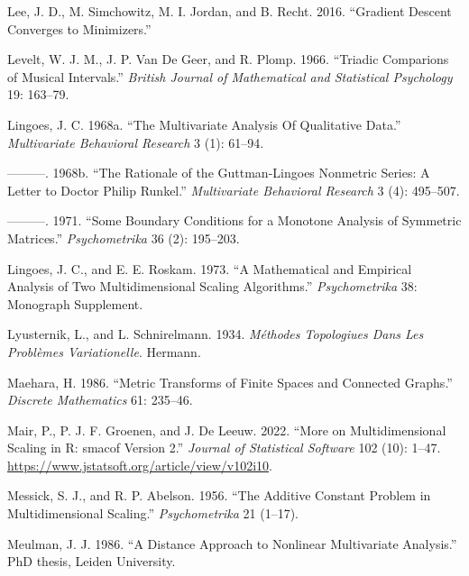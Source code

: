 \documentclass[
  12pt,
  letterpaper,
  DIV=11,
  numbers=noendperiod]{scrreprt}
\newlength{\cslhangindent}
\newenvironment{CSLReferences}[2] %
 {\begin{list}{}{%
  \setlength{\itemindent}{0pt}
  \setlength{\leftmargin}{0pt}
  \setlength{\parsep}{0pt}
  \ifodd #1
   \setlength{\leftmargin}{\cslhangindent}
   \setlength{\itemindent}{-1\cslhangindent}
  \fi
  \setlength{\itemsep}{#2\baselineskip}}}
 {\end{list}}
\theoremstyle{remark}
\begin{document}
\begin{CSLReferences}{1}{0}
Lee, J. D., M. Simchowitz, M. I. Jordan, and B. Recht. 2016.
{``{Gradient Descent Converges to Minimizers}.''}

Levelt, W. J. M., J. P. Van De Geer, and R. Plomp. 1966. {``{Triadic
Comparions of Musical Intervals}.''} \emph{British Journal of
Mathematical and Statistical Psychology} 19: 163--79.

Lingoes, J. C. 1968a. {``{The Multivariate Analysis Of Qualitative
Data}.''} \emph{Multivariate Behavioral Research} 3 (1): 61--94.

---------. 1968b. {``{The Rationale of the Guttman-Lingoes Nonmetric
Series: A Letter to Doctor Philip Runkel}.''} \emph{Multivariate
Behavioral Research} 3 (4): 495--507.

---------. 1971. {``{Some Boundary Conditions for a Monotone Analysis of
Symmetric Matrices}.''} \emph{Psychometrika} 36 (2): 195--203.

Lingoes, J. C., and E. E. Roskam. 1973. {``{A Mathematical and Empirical
Analysis of Two Multidimensional Scaling Algorithms}.''}
\emph{Psychometrika} 38: Monograph Supplement.

Lyusternik, L., and L. Schnirelmann. 1934. \emph{M{é}thodes Topologiues
Dans Les Probl{è}mes Variationelle}. Hermann.

Maehara, H. 1986. {``{Metric Transforms of Finite Spaces and Connected
Graphs}.''} \emph{Discrete Mathematics} 61: 235--46.

Mair, P., P. J. F. Groenen, and J. De Leeuw. 2022. {``{More on
Multidimensional Scaling in R: smacof Version 2}.''} \emph{Journal of
Statistical Software} 102 (10): 1--47.
\url{https://www.jstatsoft.org/article/view/v102i10}.

Messick, S. J., and R. P. Abelson. 1956. {``{The Additive Constant
Problem in Multidimensional Scaling}.''} \emph{Psychometrika} 21
(1--17).

Meulman, J. J. 1986. {``{A Distance Approach to Nonlinear Multivariate
Analysis}.''} PhD thesis, Leiden University.


\end{CSLReferences}
\end{document}
